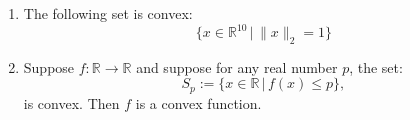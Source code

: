 \documentclass{article}
\def\x{\bm{x}}
\begin{document}
\begin{enumerate}
\begin{enumerate}
\item The following set is convex:
$$\{x \in \mathbb{R}^{10} \,|\, \|x\|_2 = 1\}$$

\item Suppose $f:\mathbb{R} \rightarrow \mathbb{R}$ and suppose for any real number $p$, the set:
$$S_p:= \{ x \in \mathbb{R}\,|\, f(x) \leq p\},$$
is convex. Then $f$ is a convex function.
\end{enumerate}
\end{enumerate}
\end{document}
